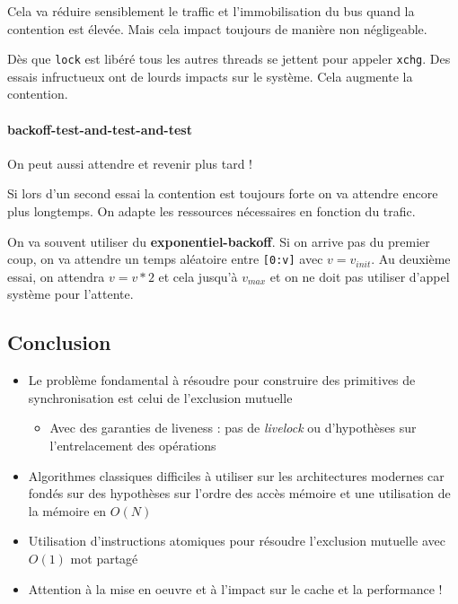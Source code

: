 Cela va réduire sensiblement le traffic et l'immobilisation du bus quand
la contention est élevée. Mais cela impact toujours de manière non
négligeable.

Dès que \texttt{lock} est libéré tous les autres threads se jettent pour
appeler \texttt{xchg}. Des essais infructueux ont de lourds impacts sur
le système. Cela augmente la contention.

\paragraph{backoff-test-and-test-and-test}\label{backoff-test-and-test-and-test}

On peut aussi attendre et revenir plus tard !

Si lors d'un second essai la contention est toujours forte on va
attendre encore plus longtemps. On adapte les ressources nécessaires en
fonction du trafic.

On va souvent utiliser du \textbf{exponentiel-backoff}. Si on arrive pas
du premier coup, on va attendre un temps aléatoire entre
\texttt{{[}0:v{]}} avec \(v=v_{init}\). Au deuxième essai, on attendra
\(v=v*2\) et cela jusqu'à \(v_{max}\) et on ne doit pas utiliser d'appel
système pour l'attente.

\subsection{Conclusion}\label{conclusion}

\begin{itemize}
\tightlist
\item
  Le problème fondamental à résoudre pour construire des primitives de
  synchronisation est celui de l'exclusion mutuelle

  \begin{itemize}
  \tightlist
  \item
    Avec des garanties de liveness : pas de \emph{livelock} ou
    d'hypothèses sur l'entrelacement des opérations
  \end{itemize}
\item
  Algorithmes classiques difficiles à utiliser sur les architectures
  modernes car fondés sur des hypothèses sur l'ordre des accès mémoire
  et une utilisation de la mémoire en \(O(N)\)
\item
  Utilisation d'instructions atomiques pour résoudre l'exclusion
  mutuelle avec \(O(1)\) mot partagé
\item
  Attention à la mise en oeuvre et à l'impact sur le cache et la
  performance !
\end{itemize}
